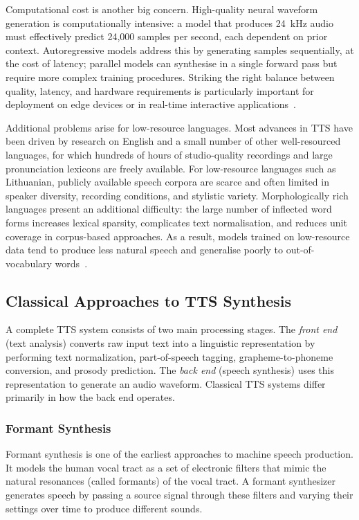 \documentclass[
         english, %
    monochrome, %
]{VUMIFSEMasterThesis}
\begin{document}
Computational cost is another big concern. High-quality neural waveform generation is computationally intensive: a model that produces 24~kHz audio must effectively predict 24,000 samples per second, each dependent on prior context. Autoregressive models address this by generating samples sequentially, at the cost of latency; parallel models can synthesise in a single forward pass but require more complex training procedures. Striking the right balance between quality, latency, and hardware requirements is particularly important for deployment on edge devices or in real-time interactive applications~\cite{kong2020hifi}.

Additional problems arise for low-resource languages. Most advances in TTS have been driven by research on English and a small number of other well-resourced languages, for which hundreds of hours of studio-quality recordings and large pronunciation lexicons are freely available. For low-resource languages such as Lithuanian, publicly available speech corpora are scarce and often limited in speaker diversity, recording conditions, and stylistic variety. Morphologically rich languages present an additional difficulty: the large number of inflected word forms increases lexical sparsity, complicates text normalisation, and reduces unit coverage in corpus-based approaches. As a result, models trained on low-resource data tend to produce less natural speech and generalise poorly to out-of-vocabulary words~\cite{hasanabadi2023overview}.

\subsection{Classical Approaches to TTS Synthesis}
\label{sec:classical}

A complete TTS system consists of two main processing stages. The \emph{front end} (text analysis) converts raw input text into a linguistic representation by performing text normalization, part-of-speech tagging, grapheme-to-phoneme conversion, and prosody prediction. The \emph{back end} (speech synthesis) uses this representation to generate an audio waveform. Classical TTS systems differ primarily in how the back end operates.

\subsubsection{Formant Synthesis}

Formant synthesis is one of the earliest approaches to machine speech production. It models the human vocal tract as a set of electronic filters that mimic the natural resonances (called formants) of the vocal tract. A formant synthesizer generates speech by passing a source signal through these filters and varying their settings over time to produce different sounds.
\end{document}
